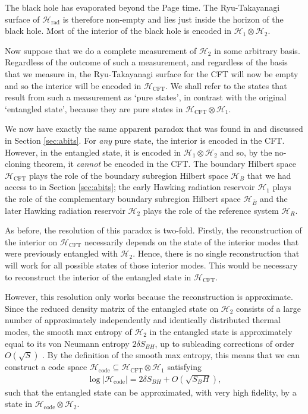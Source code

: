\documentclass[11pt,a4paper]{article}
\begin{document}
The black hole has evaporated beyond the Page time. The Ryu-Takayanagi surface of $\mathcal{H}_\text{rad}$ is therefore non-empty and lies just inside the horizon of the black hole. Most of the interior of the black hole is encoded in $\mathcal{H}_{1} \otimes \mathcal{H}_{2}$.

Now suppose that we do a complete measurement of $\mathcal{H}_{2}$ in some arbitrary basis. Regardless of the outcome of such a measurement, and regardless of the basis that we measure in, the Ryu-Takayanagi surface for the CFT will now be empty and so the interior will be encoded in $\mathcal{H}_\text{CFT}$. We shall refer to the states that result from such a measurement as `pure states', in contrast with the original `entangled state', because they are pure states in $\mathcal{H}_\text{CFT} \otimes \mathcal{H}_{1}$.

We now have exactly the same apparent paradox that was found in \cite{hayden2018learning} and discussed in Section \ref{sec:abits}. For \emph{any} pure state, the interior is encoded in the CFT. However, in the entangled state, it is encoded in $\mathcal{H}_{1} \otimes \mathcal{H}_{2}$ and so, by the no-cloning theorem, it \emph{cannot} be encoded in the CFT. The boundary Hilbert space $\mathcal{H}_\text{CFT}$ plays the role of the boundary subregion Hilbert space $\mathcal{H}_B$ that we had access to in Section \ref{sec:abits}; the early Hawking radiation reservoir $\mathcal{H}_{1}$ plays the role of the complementary boundary subregion Hilbert space $\mathcal{H}_{\bar B}$ and the later Hawking radiation reservoir $\mathcal{H}_{2}$ plays the role of the reference system $\mathcal{H}_R$.

As before, the resolution of this paradox is two-fold. Firstly, the reconstruction of the interior on $\mathcal{H}_\text{CFT}$ necessarily depends on the state of the interior modes that were previously entangled with $\mathcal{H}_{2}$.  Hence, there is no single reconstruction that will work for all possible states of those interior modes. This would be necessary to reconstruct the interior of the entangled state in $\mathcal{H}_\text{CFT}$. 

However, this resolution only works because the reconstruction is approximate. Since the reduced density matrix of the entangled state on $\mathcal{H}_2$ consists of a large number of approximately independently and identically distributed thermal modes, the smooth max entropy of $\mathcal{H}_{2}$ in the entangled state is approximately equal to its von Neumann entropy $2\delta S_{BH}$, up to subleading corrections of order $O(\sqrt{S})$ \cite{tomamichel2009fully}. By the definition of the smooth max entropy, this means that we can construct a code space $\mathcal{H}_\text{code} \subseteq \mathcal{H}_\text{CFT} \otimes \mathcal{H}_{1}$ satisfying
\begin{align}
\log |\mathcal{H}_\text{code}| = 2 \delta S_{BH} + O(\sqrt{S_BH}),
\end{align}
such that the entangled state can be approximated, with very high fidelity, by a state in $\mathcal{H}_\text{code} \otimes \mathcal{H}_{2}$.
\end{document}

